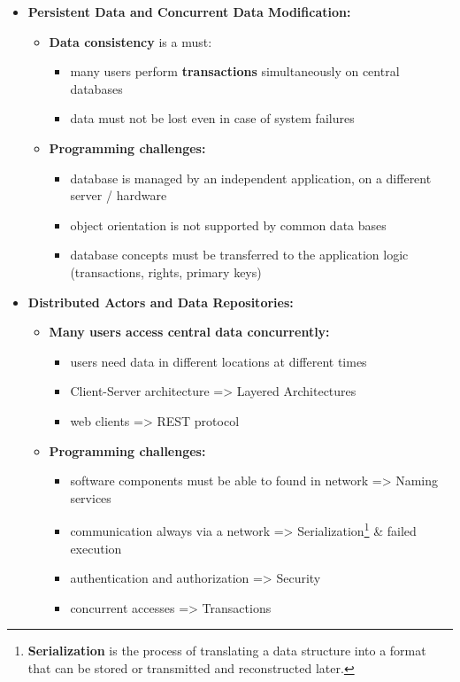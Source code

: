 \documentclass[ieeetran]{article}
\begin{document}
\begin{itemize}
\item \textbf{Persistent Data and Concurrent Data Modification:}
	\begin{itemize}
	  \item \textbf{Data consistency} is a must:
		  \begin{itemize}
		    \item many users perform \textbf{transactions} simultaneously on central databases
		\item data must not be lost even in case of system failures
		  \end{itemize}
		  \item \textbf{Programming challenges:}
			  \begin{itemize}
			    \item database is managed by an independent application, on a different server / hardware
			\item object orientation is not supported by common data bases
				\item database concepts must be transferred to the application logic (transactions, rights, primary keys)
			  \end{itemize}
	\end{itemize}

\item \textbf{Distributed Actors and Data Repositories:}
	\begin{itemize}
	  \item \textbf{Many users access central data concurrently:}
		  \begin{itemize}
		    \item users need data in different locations at different times
			    \item Client-Server architecture => Layered Architectures
		\item web clients => REST protocol
		  \end{itemize}

	\item \textbf{Programming challenges:}
		\begin{itemize}
		  \item software components must be able to found in network => Naming services
		  \item communication always via a network => Serialization\footnote{\textbf{Serialization} is the process of translating a data structure into a format that can be stored or transmitted and reconstructed later.} \& failed execution
			  \item authentication and authorization => Security
		\item concurrent accesses => Transactions
		\end{itemize}
	\end{itemize}


\end{itemize}
\end{document}
